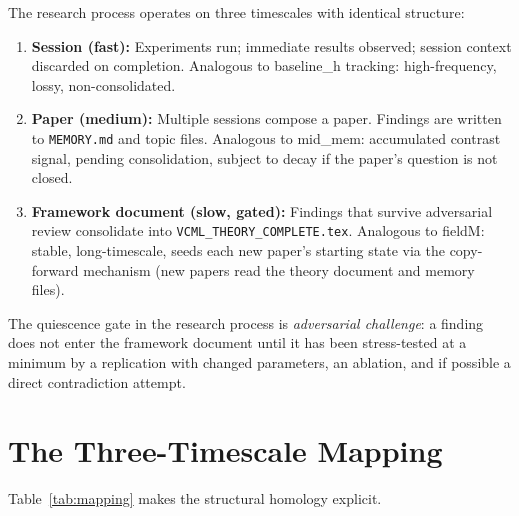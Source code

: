 \documentclass[11pt,a4paper]{article}
\begin{document}
The research process operates on three timescales with identical structure:
\begin{enumerate}
  \item \textbf{Session (fast):} Experiments run; immediate results observed;
        session context discarded on completion.
        Analogous to baseline\_h tracking: high-frequency, lossy, non-consolidated.
  \item \textbf{Paper (medium):} Multiple sessions compose a paper.
        Findings are written to \texttt{MEMORY.md} and topic files.
        Analogous to mid\_mem: accumulated contrast signal, pending consolidation,
        subject to decay if the paper's question is not closed.
  \item \textbf{Framework document (slow, gated):} Findings that survive adversarial
        review consolidate into \texttt{VCML\_THEORY\_COMPLETE.tex}.
        Analogous to fieldM: stable, long-timescale, seeds each new paper's starting state
        via the copy-forward mechanism (new papers read the theory document and memory files).
\end{enumerate}

The quiescence gate in the research process is \emph{adversarial challenge}:
a finding does not enter the framework document until it has been stress-tested
at a minimum by a replication with changed parameters, an ablation,
and if possible a direct contradiction attempt.

\section{The Three-Timescale Mapping}

Table~\ref{tab:mapping} makes the structural homology explicit.
\end{document}
